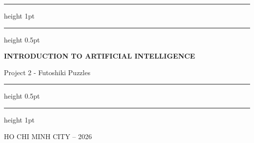 \documentclass[12pt,a4paper]{article}
\begin{document}
\begin{titlepage}
\begin{center}
        \vspace{0.5cm}
        \hrule height 1pt
        \vspace{0.1cm}
        \hrule height 0.5pt
        \vspace{0.5cm}
        
        {\Huge\bfseries\color{accentBlue} INTRODUCTION TO ARTIFICIAL INTELLIGENCE  \par}
        \vspace{0.5cm}
        
        {\Large Project 2 - Futoshiki Puzzles\par}
        \vspace{0.5cm}
        
        \hrule height 0.5pt
        \vspace{0.1cm}
        \hrule height 1pt
        \vspace{1cm}

        \vspace{5cm}
        {HO CHI MINH CITY -- 2026}
    \end{center}
\end{titlepage}
\end{document}
